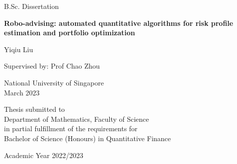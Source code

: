 \begin{titlepage}
    \begin{center}
        \vspace*{1cm}

        \Large B.Sc. Dissertation
        \vspace{1cm}

        \huge
        \textbf{Robo-advising: automated quantitative algorithms for risk profile estimation and portfolio optimization}

        \vspace{0.5cm}

        \vfill

        \Large

        Yiqiu Liu\\
        
        \bigskip
        
        Supervised by: Prof Chao Zhou

        \bigskip

        National University of Singapore\\
        March 2023

        \vfill

        \large
        Thesis submitted to\\
        Department of Mathematics, Faculty of Science\\
        in partial fulfillment of the requirements for\\
        Bachelor of Science (Honours) in Quantitative Finance\\

        \bigskip

        Academic Year 2022/2023
        
        \vspace*{1.5cm}
    \end{center}
\end{titlepage}